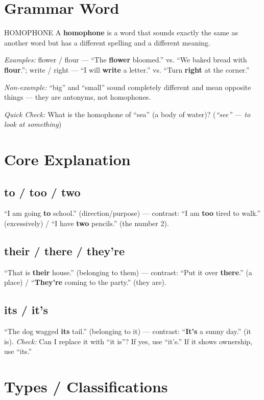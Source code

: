\section{Grammar Word}
\begin{grammarword}{HOMOPHONE}
A \textbf{homophone} is a word that sounds exactly the same as another word but has a different spelling and a different meaning.

\textit{Examples:} flower / flour --- ``The \textbf{flower} bloomed.'' vs. ``We baked bread with \textbf{flour}.''; write / right --- ``I will \textbf{write} a letter.'' vs. ``Turn \textbf{right} at the corner.''

\textit{Non-example:} ``big'' and ``small'' sound completely different and mean opposite things --- they are antonyms, not homophones.

\textit{Quick Check:} What is the homophone of ``sea'' (a body of water)? (\textit{``see'' --- to look at something})
\end{grammarword}

\section{Core Explanation}

\subsection*{to / too / two}
``I am going \textbf{to} school.'' (direction/purpose) --- contrast: ``I am \textbf{too} tired to walk.'' (excessively) / ``I have \textbf{two} pencils.'' (the number 2).

\subsection*{their / there / they're}
``That is \textbf{their} house.'' (belonging to them) --- contrast: ``Put it over \textbf{there}.'' (a place) / ``\textbf{They're} coming to the party.'' (they are).

\subsection*{its / it's}
``The dog wagged \textbf{its} tail.'' (belonging to it) --- contrast: ``\textbf{It's} a sunny day.'' (it is). \textit{Check:} Can I replace it with ``it is''? If yes, use ``it's.'' If it shows ownership, use ``its.''

\section{Types / Classifications}

